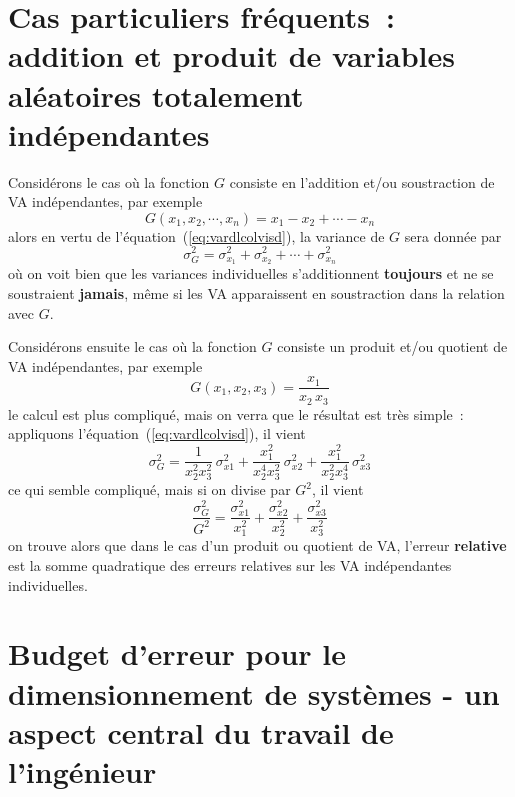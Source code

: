 \section{Cas particuliers fréquents~: addition et produit de variables aléatoires totalement indépendantes}

Considérons le cas où la fonction $G$ consiste en l'addition et/ou soustraction de VA indépendantes, par exemple
\begin{equation}
G(x_1,x_2,\cdots,x_n)=x_1-x_2+\cdots-x_n
\end{equation}
alors en vertu de l'équation~(\ref{eq:vardlcolvisd}), la variance de $G$ sera donnée par
\begin{equation}
\sigma^2_G=\sigma_{x_1}^2+\sigma_{x_2}^2+\cdots+\sigma_{x_n}^2
\end{equation}
où on voit bien que les variances individuelles s'additionnent \textbf{toujours} et ne se soustraient \textbf{jamais}, même si les VA apparaissent en soustraction dans la relation avec $G$.

Considérons ensuite le cas où la fonction $G$ consiste un produit et/ou quotient de VA indépendantes, par exemple
\begin{equation}
G(x_1,x_2,x_3)=\frac{x_1}{x_2\,x_3}
\end{equation}
le calcul est plus compliqué, mais on verra que le résultat est très simple~: appliquons l'équation~(\ref{eq:vardlcolvisd}), il vient
\begin{equation}
\sigma^2_G=
\frac{1}{x_2^2x_3^2}\,\sigma_{x1}^2+
\frac{x_1^2}{x_2^4x_3^2}\,\sigma_{x2}^2+
\frac{x_1^2}{x_2^2x_3^4}\,\sigma_{x3}^2
\end{equation}
ce qui semble compliqué, mais si on divise par $G^2$, il vient
\begin{equation}
\frac{\sigma^2_G}{G^2}=
\frac{\sigma_{x1}^2}{x_1^2}+
\frac{\sigma_{x2}^2}{x_2^2}+
\frac{\sigma_{x3}^2}{x_3^2}
\end{equation}
on trouve alors que dans le cas d'un produit ou quotient de VA, l'erreur \textbf{relative} est la somme quadratique des erreurs relatives sur les VA indépendantes individuelles.

\section{Budget d'erreur pour le dimensionnement de systèmes - un aspect central du travail de l'ingénieur}

